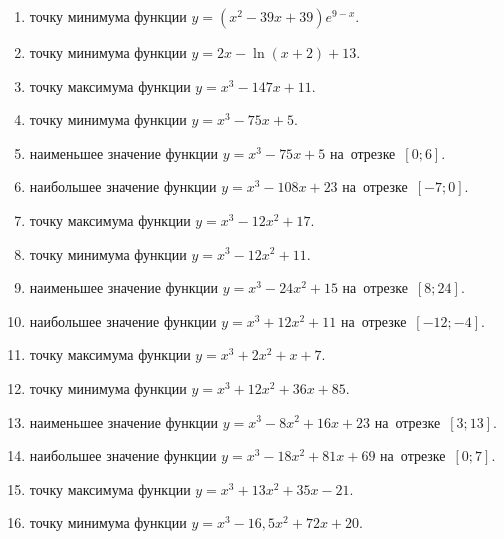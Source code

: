 \documentclass[a4paper,10pt]{article}
\begin{document}
\begin{enumerate}
\item {} точку минимума функции $y=\left(x^2-39x+39\right){{e}^{9-x}}$.

\item {} точку минимума функции $y=2x-\ln \left(x+2\right)+13$.

\item {} точку максимума функции $y=x^3 -147x +11$.

\item {} точку минимума функции $y=x^3 -75x+5$.

\item {} наименьшее значение функции $y=x^3 -75x+5$ на~отрезке~$\left[0;6\right]$.

\item {} наибольшее значение функции $y=x^3 -108x+23$ на~отрезке~$\left[-7;0\right]$.

\item {} точку максимума функции $y=x^3 -12x^2+17$.

\item {} точку минимума функции $y=x^3 -12x^2+11$.

\item {} наименьшее значение функции $y=x^3 -24x^2+15$ на~отрезке~$\left[8;24\right]$.

\item {} наибольшее значение функции $y=x^3 +12x^2+11$ на~отрезке~$\left[-12;-4\right]$.

\item {} точку максимума функции $y=x^3 +2x^2+x+7$.

\item {} точку минимума функции $y=x^3 +12x^2+36x+85$.

\item {} наименьшее значение функции $y=x^3 -8x^2+16x+23$ на~отрезке~$\left[3;13\right]$.

\item {} наибольшее значение функции $y=x^3 -18x^2+81x+69$ на~отрезке~$\left[0;7\right]$.

\item {} точку максимума функции $y=x^3 +13x^2+35x-21$.

\item {} точку минимума функции $y=x^3 -16,5x^2+72x+20$.


\end{enumerate}
\end{document}
